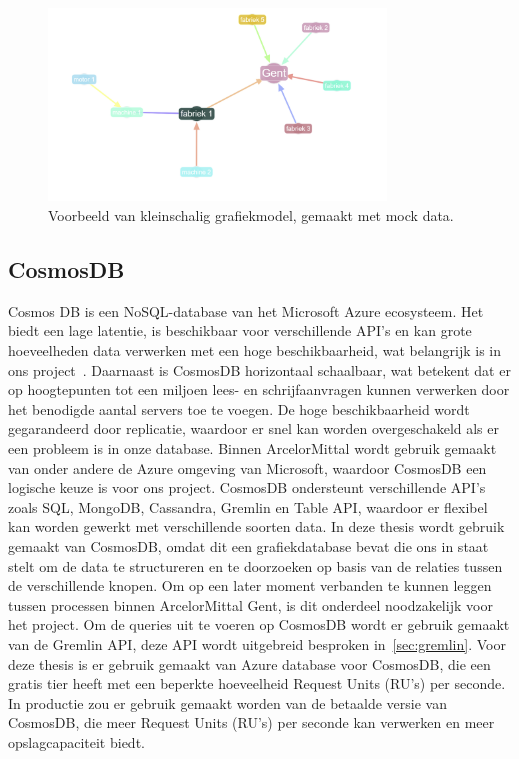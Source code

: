 \begin{figure}[H]
     \centering
     \includegraphics[width=0.8\textwidth]{./img/grapmodel_example.png}
     \caption[Voorbeeld Grafiekmodel.]{\label{fig:graphmodel}Voorbeeld van kleinschalig grafiekmodel, gemaakt met mock data.}
\end{figure}

\subsection{CosmosDB}
Cosmos DB is een NoSQL-database van het Microsoft Azure ecosysteem. Het biedt een lage latentie, is beschikbaar voor verschillende API's en kan grote hoeveelheden data verwerken met een hoge beschikbaarheid, wat belangrijk is in ons project~\autocite{CosmosDB2024}.
Daarnaast is CosmosDB horizontaal schaalbaar, wat betekent dat er op hoogtepunten tot een miljoen lees- en schrijfaanvragen kunnen verwerken door het benodigde aantal servers toe te voegen.
De hoge beschikbaarheid wordt gegarandeerd door replicatie, waardoor er snel kan worden overgeschakeld als er een probleem is in onze database.
Binnen ArcelorMittal wordt gebruik gemaakt van onder andere de Azure omgeving van Microsoft, waardoor CosmosDB een logische keuze is voor ons project.
CosmosDB ondersteunt verschillende API's zoals SQL, MongoDB, Cassandra, Gremlin en Table API, waardoor er flexibel kan worden gewerkt met verschillende soorten data.
In deze thesis wordt gebruik gemaakt van CosmosDB, omdat dit een grafiekdatabase bevat die ons in staat stelt om de data te structureren en te doorzoeken op basis van de relaties tussen de verschillende knopen.
Om op een later moment verbanden te kunnen leggen tussen processen binnen ArcelorMittal Gent, is dit onderdeel noodzakelijk voor het project.
Om de queries uit te voeren op CosmosDB wordt er gebruik gemaakt van de Gremlin API, deze API wordt uitgebreid besproken in~\ref{sec:gremlin}.
Voor deze thesis is er gebruik gemaakt van Azure database voor CosmosDB, die een gratis tier heeft met een beperkte hoeveelheid Request Units (RU's) per seconde.
In productie zou er gebruik gemaakt worden van de betaalde versie van CosmosDB, die meer Request Units (RU's) per seconde kan verwerken en meer opslagcapaciteit biedt.

